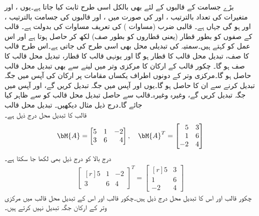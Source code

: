 بڑے جسامت کے قالبوں کے لئے بھی  بالکل اسی طرح ثابت کیا جاتا ہے۔یوں ،  اور  متغیرات کی تعداد بالترتیب ،  اور  کی صورت میں ،  اور  قالبوں کی جسامت بالترتیب ،  اور  ہو گی جہاں  ہے۔  قالبی ضرب (مساوات )  کی تعریف مساوات  کی بدولت ہے۔
قالب کے صفوں کو بطور قطار (یعنی قطاروں کو بطور صف) لکھ کر  حاصل ہوتا ہے اور اس عمل کو  کہتے ہیں۔سمتیہ کی تبدیلی محل بھی اسی طرح کی جاتی ہے۔اس طرح قالب کا صف، تبدیل محل قالب کا قطار ہو گا اور یونہی قالب کا قطار، تبدیل محل قالب کا صف ہو گا۔ چکور قالب کے ارکان کا مرکزی وتر میں  لینے سے بھی تبدیل محل قالب حاصل ہو گا۔مرکزی وتر کے دونوں اطراف یکساں مقامات پر ارکان کی آپس میں جگہ تبدیل کرنے سے ان کا  حاصل ہو گا۔یوں  اور  آپس میں جگہ تبدیل کریں گے،  اور  آپس میں جگہ تبدیل کریں گے، وغیرہ وغیرہ۔قالب  سے حاصل تبدیل محل قالب کو  سے ظاہر کیا جائے گا۔درج ذیل مثال دیکھیں۔
\quad تبدیل محل قالب\\
قالب  کا تبدیل محل  درج ذیل ہے۔
\begin{align*}
\bM{A}=\begin{bmatrix*}[r] 5&1&-2\\3&6&4  \end{bmatrix*}, \quad \bM{A}^T=\begin{bmatrix*}[r] 5&3\\1&6\\-2&4 \end{bmatrix*}
\end{align*}
درج بالا کو درج ذیل بھی لکھا جا سکتا ہے۔
\begin{align*}
\begin{bmatrix*}[r] 5&1&-2\\3&6&4  \end{bmatrix*}^T=\begin{bmatrix*}[r] 5&3\\1&6\\-2&4 \end{bmatrix*}
\end{align*}
چکور قالب اور اس کا تبدیل محل درج ذیل ہیں۔چکور قالب اور اس کے تبدیل محل قالب میں مرکزی وتر کے ارکان جگہ تبدیل نہیں کرتے ہیں۔
